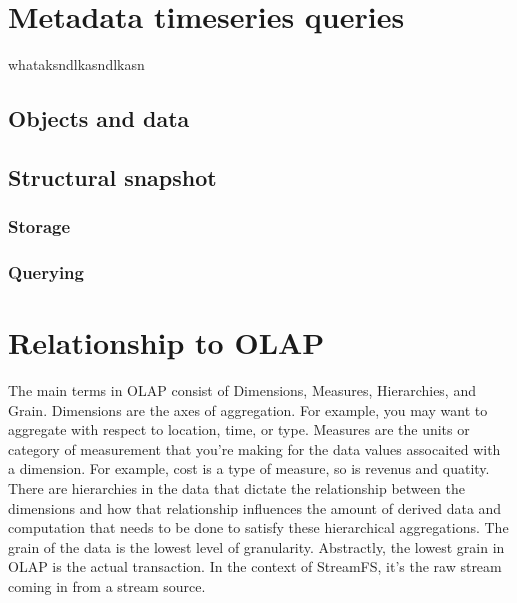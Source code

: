 \section{Metadata timeseries queries}
\label{sec:mtsq}
whataksndlkasndlkasn


\subsection{Objects and data}
%
%
%


\subsection{Structural snapshot}

\subsubsection{Storage}

\subsubsection{Querying}

\section{Relationship to OLAP}
The main terms in OLAP consist of Dimensions, Measures, Hierarchies, and Grain.  Dimensions are the axes of aggregation.
For example, you may want to aggregate with respect to location, time, or type.  Measures are the units or category of
measurement that you're making for the data values assocaited with a dimension.  For example, cost is a type of measure,
so is revenus and quatity.  There are hierarchies in the data that dictate the relationship between the dimensions
and how that relationship influences the amount of derived data and computation that needs to be done to satisfy
these hierarchical aggregations.  The grain of the data is the lowest level of granularity.  Abstractly, the lowest grain
in OLAP is the actual transaction.  In the context of StreamFS, it's the raw stream coming in from a stream source.

